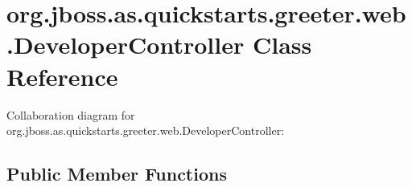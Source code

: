 \hypertarget{classorg_1_1jboss_1_1as_1_1quickstarts_1_1greeter_1_1web_1_1_developer_controller}{}\section{org.\+jboss.\+as.\+quickstarts.\+greeter.\+web.\+Developer\+Controller Class Reference}
\label{classorg_1_1jboss_1_1as_1_1quickstarts_1_1greeter_1_1web_1_1_developer_controller}


Collaboration diagram for org.\+jboss.\+as.\+quickstarts.\+greeter.\+web.\+Developer\+Controller\+:
\subsection*{Public Member Functions}

